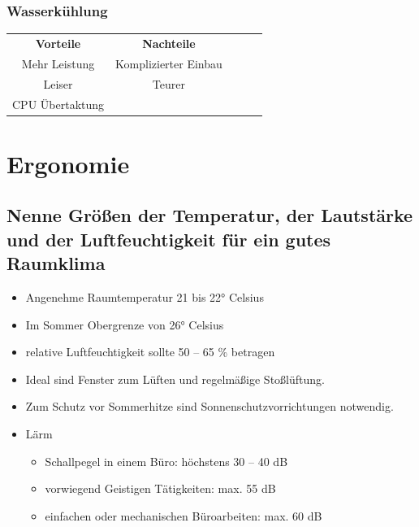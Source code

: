 \documentclass[a4paper]{article}
\begin{document}
    \subsubsection{\color{codegreen}Wasserkühlung}
    \begin{center}
        \begin{tabular}{|c|clll}
            \cline{1-2}
            \textbf{Vorteile}                                            & \multicolumn{1}{c|}{\textbf{Nachteile}}                          & & & \\ \cline{1-2}
            {\color[HTML]{32CB00} Mehr Leistung}                         & \multicolumn{1}{c|}{{\color[HTML]{F56B00} Komplizierter Einbau}} &  &  &  \\ \cline{1-2}
            {\color[HTML]{32CB00} Leiser}                                & \multicolumn{1}{c|}{{\color[HTML]{F56B00} Teurer}}               &  &  &  \\ \cline{1-2}
            \multicolumn{1}{|l|}{{\color[HTML]{32CB00} CPU Übertaktung}} & \multicolumn{1}{l}{}                                             &  &  &  \\ \cline{1-1}
        \end{tabular}
    \end{center}

    \section{Ergonomie}\label{sec:ergonomie}

    \subsection{\color{red}Nenne Größen der Temperatur, der Lautstärke und der Luftfeuchtigkeit für ein gutes Raumklima}\label{subsec:color{red}nenne-größen-der-temperatur-der-lautstärke-und-der-luftfeuchtigkeit-für-ein-gutes-raumklima}
    \begin{itemize}
        \color{magenta}
        \item Angenehme Raumtemperatur 21 bis 22° Celsius
        \item Im Sommer Obergrenze von 26° Celsius
        \item relative Luftfeuchtigkeit sollte 50 – 65 \% betragen
        \item Ideal sind Fenster zum Lüften und regelmäßige Stoßlüftung.
        \item Zum Schutz vor Sommerhitze sind Sonnenschutzvorrichtungen notwendig.
        \item \color[HTML]{F56B00} Lärm
        \begin{itemize}
            \item Schallpegel in einem Büro: höchstens 30 – 40 dB
            \item vorwiegend Geistigen Tätigkeiten: max.
            55 dB
            \item einfachen oder mechanischen Büroarbeiten: max.
            60 dB
        \end{itemize}
    \end{itemize}
\end{document}
